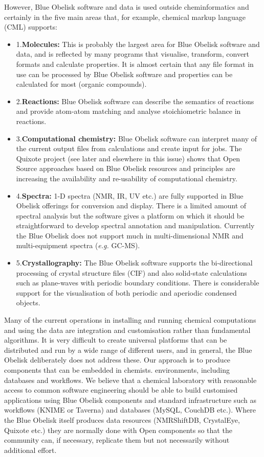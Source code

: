 \documentclass[10pt]{bmc_article}
\newenvironment{bmcformat}{\fussy\setboolean{publ}{true}}{\fussy}
\begin{document}
\begin{bmcformat}
However, Blue Obelisk software and data is used outside
cheminformatics and certainly in the five main areas that, for
example, chemical markup language (CML) supports:

\begin{itemize}
\item{1.}{\bf Molecules:} This is probably the largest area for Blue
Obelisk software and data, and is reflected by many programs that
visualise, transform, convert formats and calculate properties. It is
almost certain that any file format in use can be processed by Blue
Obelisk software and properties can be calculated for most (organic
compounds).
\item{2.}{\bf Reactions:} Blue Obelisk software can describe the
semantics of reactions and provide atom-atom matching and analyse
stoichiometric balance in reactions.
\item{3.}{\bf Computational chemistry:} Blue Obelisk software can
interpret many of the current output files from calculations and
create input for jobs. The Quixote project (see later and elsewhere in
this issue) shows that Open Source approaches based on Blue Obelisk
resources and principles are increasing the availability and
re-usability of computational chemistry.
\item{4.}{\bf Spectra:} 1-D spectra (NMR, IR, UV etc.) are fully
supported in Blue Obelisk offerings for conversion and display. There
is a limited amount of spectral analysis but the software gives a
platform on which it should be straightforward to develop spectral
annotation and manipulation. Currently the Blue Obelisk does not
support much in multi-dimensional NMR and multi-equipment spectra
({\it e.g.} GC-MS).
\item{5.}{\bf Crystallography:} The Blue Obelisk software supports the
bi-directional processing of crystal structure files (CIF) and also
solid-state calculations such as plane-waves with periodic boundary
conditions. There is considerable support for the visualisation of
both periodic and aperiodic condensed objects.
\end{itemize}

Many of the current operations in installing and running chemical
computations and using the data are integration and customisation
rather than fundamental algorithms. It is very difficult to create
universal platforms that can be distributed and run by a wide range of
different users, and in general, the Blue Obelisk deliberately does
not address these. Our approach is to produce components that can be
embedded in chemists. environments, including databases and workflows.
We believe that a chemical laboratory with reasonable access to common
software engineering should be able to build customised applications
using Blue Obelisk components and standard infrastructure such as
workflows (KNIME or Taverna) and databases (MySQL, CouchDB etc.).
Where the Blue Obelisk itself produces data resources (NMRShiftDB,
CrystalEye, Quixote etc.) they are normally done with Open components
so that the community can, if necessary, replicate them but not
necessarily without additional effort.


\end{bmcformat}
\end{document}
